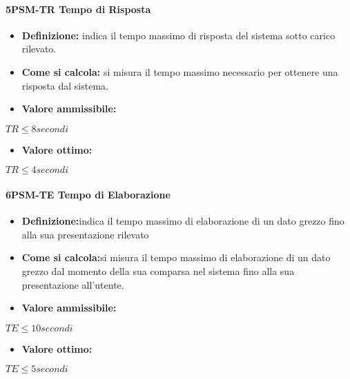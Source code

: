 \paragraph*{5PSM-TR Tempo di Risposta}
\begin{itemize}
    \item \textbf{Definizione:} indica il tempo massimo di risposta del sistema sotto carico rilevato.
    \item \textbf{Come si calcola:} si misura il tempo massimo necessario per ottenere una risposta dal sistema.
\end{itemize}
\begin{itemize}
    \item \textbf{Valore ammissibile:}
\end{itemize}
\begin{center}
    $TR \leq 8 secondi$
\end{center}
\begin{itemize}
    \item \textbf{Valore ottimo:}
\end{itemize}
\begin{center}
    $TR \leq 4secondi$
\end{center}

\paragraph*{6PSM-TE Tempo di Elaborazione}
\begin{itemize}
    \item \textbf{Definizione:}indica il tempo massimo di elaborazione di un dato grezzo fino alla sua presentazione rilevato
    \item \textbf{Come si calcola:}si misura il tempo massimo di elaborazione di un dato grezzo dal momento della sua comparsa nel sistema fino alla sua presentazione all’utente.
\end{itemize}
\begin{itemize}
    \item \textbf{Valore ammissibile:}
\end{itemize}
\begin{center}
    $TE \leq 10 secondi$
\end{center}
\begin{itemize}
    \item \textbf{Valore ottimo:}
\end{itemize}
\begin{center}
    $TE \leq 5secondi$
\end{center}

